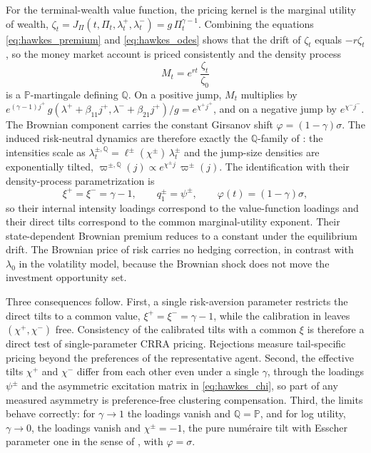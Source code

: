 \documentclass[11pt]{article}
\theoremstyle{remark}
\newcommand{\PP}{\mathbb{P}}
\newcommand{\QQ}{\mathbb{Q}}
\begin{document}
For the terminal-wealth value function, the pricing kernel is the marginal utility of wealth, $\zeta_{t} = J_{\Pi}(t,\Pi_{t},\lambda^{+}_{t},\lambda^{-}_{t}) = g\, \Pi_{t}^{\gamma-1}$. Combining the equations \eqref{eq:hawkes_premium} and \eqref{eq:hawkes_odes} shows that the drift of $\zeta_{t}$ equals $-r\zeta_{t}$, so the money market account is priced consistently and the density process
\begin{equation}\label{eq:hawkes_kernel}
M_{t} = e^{r t}\, \frac{\zeta_{t}}{\zeta_{0}}
\end{equation}
is a $\PP$-martingale defining $\QQ$. On a positive jump, $M_{t}$ multiplies by $e^{(\gamma-1)j^{+}}\, g(\lambda^{+}+\beta_{11}j^{+}, \lambda^{-}+\beta_{21}j^{+})/g = e^{\chi^{+} j^{+}}$, and on a negative jump by $e^{\chi^{-} j^{-}}$. The Brownian component carries the constant Girsanov shift $\varphi = (1-\gamma)\sigma$. The induced risk-neutral dynamics are therefore exactly the $\QQ$-family of \cite{LiuPackhamSepp2026}: the intensities scale as $\lambda^{\pm,\QQ}_{t} = \ell^{\pm}(\chi^{\pm})\,\lambda^{\pm}_{t}$ and the jump-size densities are exponentially tilted, $\varpi^{\pm,\QQ}(j) \propto e^{\chi^{\pm} j}\, \varpi^{\pm}(j)$. The identification with their density-process parametrization is
\begin{equation}\label{eq:hawkes_identification}
\xi^{+} = \xi^{-} = \gamma - 1, \qquad q_{1}^{\pm} = \psi^{\pm}, \qquad \varphi(t) = (1-\gamma)\sigma,
\end{equation}
so their internal intensity loadings correspond to the value-function loadings and their direct tilts correspond to the common marginal-utility exponent. Their state-dependent Brownian premium reduces to a constant under the equilibrium drift. The Brownian price of risk carries no hedging correction, in contrast with $\lambda_{0}$ in the volatility model, because the Brownian shock does not move the investment opportunity set.

Three consequences follow. First, a single risk-aversion parameter restricts the direct tilts to a common value, $\xi^{+}=\xi^{-}=\gamma-1$, while the calibration in \cite{LiuPackhamSepp2026} leaves $(\chi^{+},\chi^{-})$ free. Consistency of the calibrated tilts with a common $\xi$ is therefore a direct test of single-parameter CRRA pricing. Rejections measure tail-specific pricing beyond the preferences of the representative agent. Second, the effective tilts $\chi^{+}$ and $\chi^{-}$ differ from each other even under a single $\gamma$, through the loadings $\psi^{\pm}$ and the asymmetric excitation matrix in \eqref{eq:hawkes_chi}, so part of any measured asymmetry is preference-free clustering compensation. Third, the limits behave correctly: for $\gamma \to 1$ the loadings vanish and $\QQ = \PP$, and for log utility, $\gamma \to 0$, the loadings vanish and $\chi^{\pm} = -1$, the pure num\'{e}raire tilt with Esscher parameter one in the sense of \cite{GerberShiu1994}, with $\varphi = \sigma$.
\end{document}

